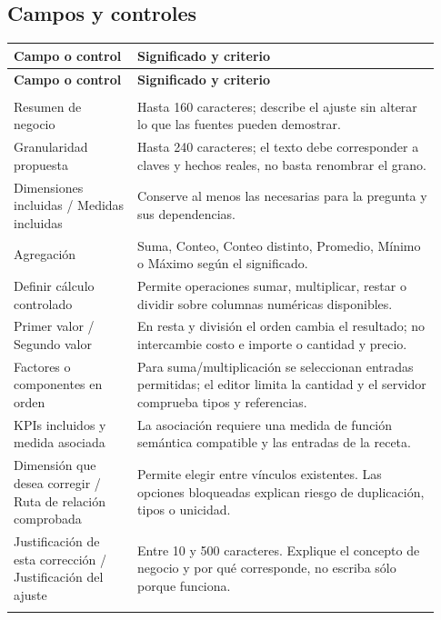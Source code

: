 \subsection{Campos y controles}
\begingroup
\fontsize{10}{12.5}\selectfont
\setlength{\tabcolsep}{5pt}
\renewcommand{\arraystretch}{1.15}
\begin{longtable}{@{}>{\RaggedRight\arraybackslash}p{0.27\linewidth}>{\RaggedRight\arraybackslash}p{0.66\linewidth}@{}}
\toprule
\textbf{Campo o control} & \textbf{Significado y criterio} \\
\midrule
\endfirsthead
\toprule
\textbf{Campo o control} & \textbf{Significado y criterio} \\
\midrule
\endhead
\midrule
\multicolumn{2}{r}{\footnotesize Continúa en la página siguiente}\\
\endfoot
\bottomrule
\endlastfoot
Resumen de negocio & Hasta 160 caracteres; describe el ajuste sin alterar lo que las fuentes pueden demostrar. \\
\addlinespace[3pt]
Granularidad propuesta & Hasta 240 caracteres; el texto debe corresponder a claves y hechos reales, no basta renombrar el grano. \\
\addlinespace[3pt]
Dimensiones incluidas / Medidas incluidas & Conserve al menos las necesarias para la pregunta y sus dependencias. \\
\addlinespace[3pt]
Agregación & Suma, Conteo, Conteo distinto, Promedio, Mínimo o Máximo según el significado. \\
\addlinespace[3pt]
Definir cálculo controlado & Permite operaciones sumar, multiplicar, restar o dividir sobre columnas numéricas disponibles. \\
\addlinespace[3pt]
Primer valor / Segundo valor & En resta y división el orden cambia el resultado; no intercambie costo e importe o cantidad y precio. \\
\addlinespace[3pt]
Factores o componentes en orden & Para suma/multiplicación se seleccionan entradas permitidas; el editor limita la cantidad y el servidor comprueba tipos y referencias. \\
\addlinespace[3pt]
KPIs incluidos y medida asociada & La asociación requiere una medida de función semántica compatible y las entradas de la receta. \\
\addlinespace[3pt]
Dimensión que desea corregir / Ruta de relación comprobada & Permite elegir entre vínculos existentes. Las opciones bloqueadas explican riesgo de duplicación, tipos o unicidad. \\
\addlinespace[3pt]
Justificación de esta corrección / Justificación del ajuste & Entre 10 y 500 caracteres. Explique el concepto de negocio y por qué corresponde, no escriba sólo porque funciona. \\
\addlinespace[3pt]
\end{longtable}
\endgroup

